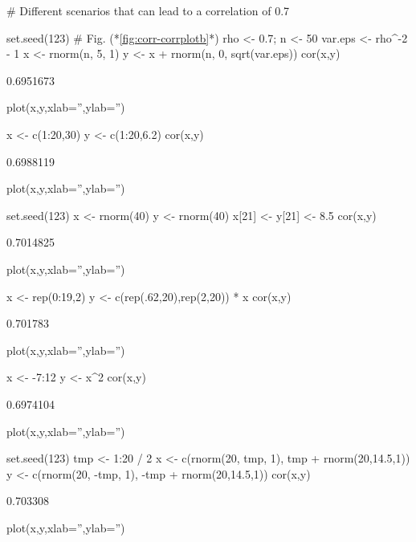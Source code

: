 \begin{Schunk}
\begin{Sinput}
# Different scenarios that can lead to a correlation of 0.7

set.seed(123)   # Fig. (*\ref{fig:corr-corrplotb}*)
rho <- 0.7; n <- 50
var.eps <- rho^-2 - 1
x <- rnorm(n, 5, 1)
y <- x + rnorm(n, 0, sqrt(var.eps))
cor(x,y)
\end{Sinput}
\begin{Soutput}
[1] 0.6951673
\end{Soutput}
\begin{Sinput}
plot(x,y,xlab='',ylab='')

x <- c(1:20,30)
y <- c(1:20,6.2)
cor(x,y)
\end{Sinput}
\begin{Soutput}
[1] 0.6988119
\end{Soutput}
\begin{Sinput}
plot(x,y,xlab='',ylab='')

set.seed(123)
x <- rnorm(40)
y <- rnorm(40)
x[21] <- y[21] <- 8.5
cor(x,y)
\end{Sinput}
\begin{Soutput}
[1] 0.7014825
\end{Soutput}
\begin{Sinput}
plot(x,y,xlab='',ylab='')

x <- rep(0:19,2)
y <- c(rep(.62,20),rep(2,20)) * x
cor(x,y)
\end{Sinput}
\begin{Soutput}
[1] 0.701783
\end{Soutput}
\begin{Sinput}
plot(x,y,xlab='',ylab='')

x <- -7:12
y <- x^2
cor(x,y)
\end{Sinput}
\begin{Soutput}
[1] 0.6974104
\end{Soutput}
\begin{Sinput}
plot(x,y,xlab='',ylab='')

set.seed(123)
tmp <- 1:20 / 2
x <- c(rnorm(20, tmp, 1), tmp + rnorm(20,14.5,1))
y <- c(rnorm(20, -tmp, 1), -tmp + rnorm(20,14.5,1))
cor(x,y)
\end{Sinput}
\begin{Soutput}
[1] 0.703308
\end{Soutput}
\begin{Sinput}
plot(x,y,xlab='',ylab='')
\end{Sinput}
\begin{figure}[htbp]


\end{figure}
\end{Schunk}
